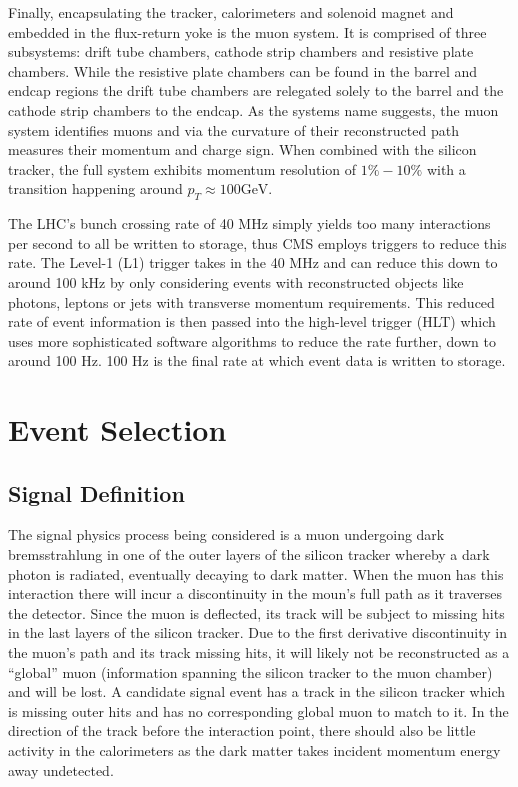 \documentclass[a4paper,12pt]{article}
\begin{document}
    Finally, encapsulating the tracker, calorimeters and solenoid magnet and
    embedded in the flux-return yoke is the muon system. It is comprised of
    three subsystems: drift tube chambers, cathode strip chambers and resistive
    plate chambers. While the resistive plate chambers can be found in the
    barrel and endcap regions the drift tube chambers are relegated solely to
    the barrel and the cathode strip chambers to the endcap. As the systems name
    suggests, the muon system identifies muons and via the curvature of their
    reconstructed path measures their momentum and charge sign. When combined
    with the silicon tracker, the full system exhibits momentum resolution of
    $1\% - 10\%$ with a transition happening around $p_T \approx 100
    \text{GeV}$.

    The LHC's bunch crossing rate of 40 MHz simply yields too many interactions
    per second to all be written to storage, thus CMS employs triggers to reduce
    this rate. The Level-1 (L1) trigger takes in the 40 MHz and can reduce this
    down to around 100 kHz by only considering events with reconstructed objects
    like photons, leptons or jets with transverse momentum requirements. This
    reduced rate of event information is then passed into the high-level trigger
    (HLT) which uses more sophisticated software algorithms to reduce the rate
    further, down to around 100 Hz. 100 Hz is the final rate at which event data
    is written to storage.

\section{Event Selection}

    \subsection{Signal Definition}

        The signal physics process being considered is a muon undergoing dark
        bremsstrahlung in one of the outer layers of the silicon tracker whereby
        a dark photon is radiated, eventually decaying to dark matter. When the
        muon has this interaction there will incur a discontinuity in the moun's
        full path as it traverses the detector. Since the muon is deflected, its
        track will be subject to missing hits in the last layers of the silicon
        tracker. Due to the first derivative discontinuity in the muon's path
        and its track missing hits, it will likely not be reconstructed as a
        ``global'' muon (information spanning the silicon tracker to the muon
        chamber) and will be lost. A candidate signal event has a track in the
        silicon tracker which is missing outer hits and has no corresponding
        global muon to match to it. In the direction of the track before the
        interaction point, there should also be little activity in the
        calorimeters as the dark matter takes incident momentum energy away
        undetected.
\end{document}
